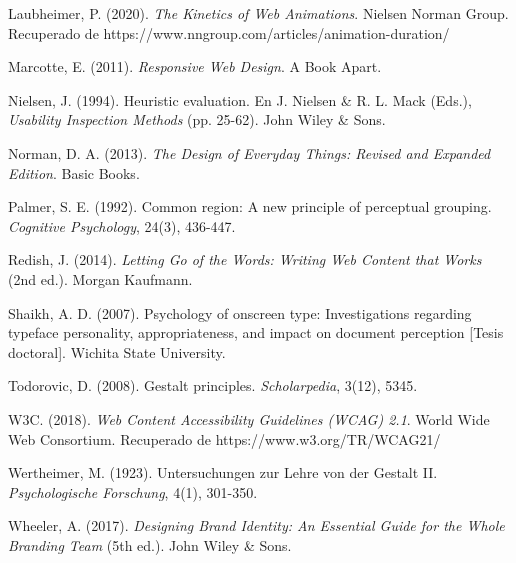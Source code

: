 \documentclass[12pt,a4paper,oneside]{article}
\begin{document}
\begin{flushleft}
\vspace{0.5cm}

Laubheimer, P. (2020). \textit{The Kinetics of Web Animations}. Nielsen Norman Group. Recuperado de https://www.nngroup.com/articles/animation-duration/

\vspace{0.5cm}

Marcotte, E. (2011). \textit{Responsive Web Design}. A Book Apart.

\vspace{0.5cm}

Nielsen, J. (1994). Heuristic evaluation. En J. Nielsen \& R. L. Mack (Eds.), \textit{Usability Inspection Methods} (pp. 25-62). John Wiley \& Sons.

\vspace{0.5cm}

Norman, D. A. (2013). \textit{The Design of Everyday Things: Revised and Expanded Edition}. Basic Books.

\vspace{0.5cm}

Palmer, S. E. (1992). Common region: A new principle of perceptual grouping. \textit{Cognitive Psychology}, 24(3), 436-447.

\vspace{0.5cm}

Redish, J. (2014). \textit{Letting Go of the Words: Writing Web Content that Works} (2nd ed.). Morgan Kaufmann.

\vspace{0.5cm}

Shaikh, A. D. (2007). Psychology of onscreen type: Investigations regarding typeface personality, appropriateness, and impact on document perception [Tesis doctoral]. Wichita State University.

\vspace{0.5cm}

Todorovic, D. (2008). Gestalt principles. \textit{Scholarpedia}, 3(12), 5345.

\vspace{0.5cm}

W3C. (2018). \textit{Web Content Accessibility Guidelines (WCAG) 2.1}. World Wide Web Consortium. Recuperado de https://www.w3.org/TR/WCAG21/

\vspace{0.5cm}

Wertheimer, M. (1923). Untersuchungen zur Lehre von der Gestalt II. \textit{Psychologische Forschung}, 4(1), 301-350.

\vspace{0.5cm}

Wheeler, A. (2017). \textit{Designing Brand Identity: An Essential Guide for the Whole Branding Team} (5th ed.). John Wiley \& Sons.

\end{flushleft}
\end{document}
